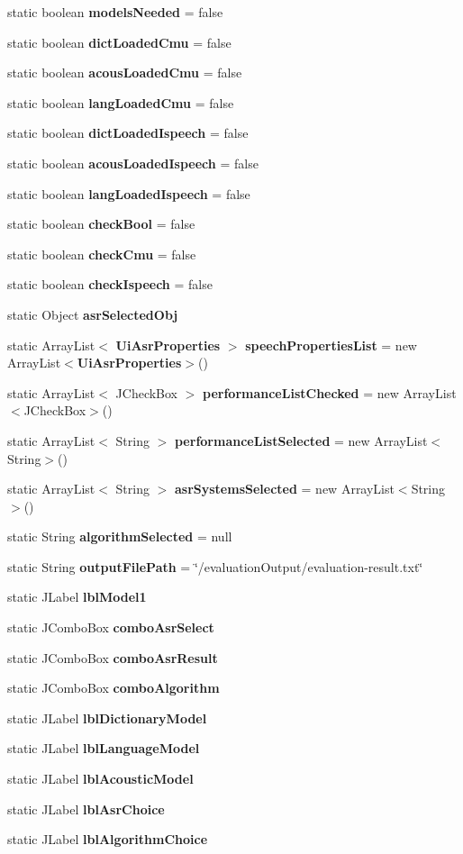 \begin{DoxyCompactItemize}
static boolean {\bf models\+Needed} = false
\item 
static boolean {\bf dict\+Loaded\+Cmu} = false
\item 
static boolean {\bf acous\+Loaded\+Cmu} = false
\item 
static boolean {\bf lang\+Loaded\+Cmu} = false
\item 
static boolean {\bf dict\+Loaded\+Ispeech} = false
\item 
static boolean {\bf acous\+Loaded\+Ispeech} = false
\item 
static boolean {\bf lang\+Loaded\+Ispeech} = false
\item 
static boolean {\bf check\+Bool} = false
\item 
static boolean {\bf check\+Cmu} = false
\item 
static boolean {\bf check\+Ispeech} = false
\item 
static Object {\bf asr\+Selected\+Obj}
\item 
static Array\+List$<$ {\bf Ui\+Asr\+Properties} $>$ {\bf speech\+Properties\+List} = new Array\+List$<${\bf Ui\+Asr\+Properties}$>$()
\item 
static Array\+List$<$ J\+Check\+Box $>$ {\bf performance\+List\+Checked} = new Array\+List$<$J\+Check\+Box$>$()
\item 
static Array\+List$<$ String $>$ {\bf performance\+List\+Selected} = new Array\+List$<$String$>$()
\item 
static Array\+List$<$ String $>$ {\bf asr\+Systems\+Selected} = new Array\+List$<$String$>$()
\item 
static String {\bf algorithm\+Selected} = null
\item 
static String {\bf output\+File\+Path} = \char`\"{}/evaluation\+Output/evaluation-\/result.\+txt\char`\"{}
\item 
static J\+Label {\bf lbl\+Model1}
\item 
static J\+Combo\+Box {\bf combo\+Asr\+Select}
\item 
static J\+Combo\+Box {\bf combo\+Asr\+Result}
\item 
static J\+Combo\+Box {\bf combo\+Algorithm}
\item 
static J\+Label {\bf lbl\+Dictionary\+Model}
\item 
static J\+Label {\bf lbl\+Language\+Model}
\item 
static J\+Label {\bf lbl\+Acoustic\+Model}
\item 
static J\+Label {\bf lbl\+Asr\+Choice}
\item 
static J\+Label {\bf lbl\+Algorithm\+Choice}
\end{DoxyCompactItemize}


